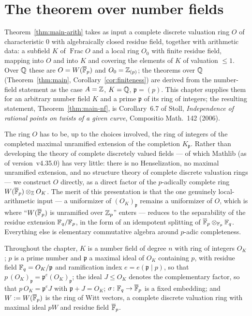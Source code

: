 \chapter{The theorem over number fields}
\label{ch:numberfield}

Theorem~\ref{thm:main-arith} takes as input a complete discrete valuation ring $O$ of
characteristic $0$ with algebraically closed residue field, together with arithmetic
data: a subfield $K$ of $\operatorname{Frac} O$ and a local ring $O_0$ with finite
residue field, mapping into $O$ and into $K$ and covering the elements of $K$ of
valuation $\le 1$. Over $\mathbb{Q}$ these are $O = W(\overline{\mathbb{F}}_p)$ and $O_0 = \mathbb{Z}_{(p)}$; the
theorems over $\mathbb{Q}$ (Theorem~\ref{thm:main}, Corollary~\ref{cor:finiteness}) are derived
from the number-field statement as the case $A = \mathbb{Z}$, $K = \mathbb{Q}$, $\mathfrak p = (p)$. This chapter supplies
them for an arbitrary number field $K$ and a prime $\mathfrak p$ of its ring of integers; the resulting statement,
Theorem~\ref{thm:main-nf}, is Corollary~6.7 of Stoll, \emph{Independence of rational
points on twists of a given curve}, Compositio Math.\ 142 (2006).

The ring $O$ has to be, up to the choices involved, the ring of integers of the completed
maximal unramified extension of the completion $K_{\mathfrak p}$. Rather than developing
the theory of complete discretely valued fields --- of which Mathlib (as of
version~v4.35.0) has very little: there is no Henselization, no maximal unramified extension, and no structure
theory of complete discrete valuation rings --- we construct $O$ directly, as a direct
factor of the $p$-adically complete ring $W(\overline{\mathbb{F}}_p) \otimes_{\mathbb{Z}} O_K$. The merit of this
presentation is that the one genuinely local-arithmetic input --- a uniformizer of
$(O_K)_{\mathfrak p}$ remains a uniformizer of $O$, which is where ``$W(\overline{\mathbb{F}}_p)$ is
unramified over $\mathbb{Z}_p$'' enters --- reduces to the separability of the residue extension
$\mathbb{F}_q/\mathbb{F}_p$, in the form of an idempotent splitting of $\overline{\mathbb{F}}_p \otimes_{\mathbb{F}_p} \mathbb{F}_q$.
Everything else is elementary commutative algebra around $p$-adic completeness.

Throughout the chapter, $K$ is a number field of degree $n$ with ring of integers $O_K$;
$p$ is a prime number and $\mathfrak p$ a maximal ideal of $O_K$ containing $p$, with
residue field $\mathbb{F}_q = O_K/\mathfrak p$ and ramification index $e = e(\mathfrak p \mid p)$,
so that $p\,(O_K)_{\mathfrak p} = \mathfrak p^e (O_K)_{\mathfrak p}$; the ideal
$J \le O_K$ denotes the complementary factor, so that $p\,O_K = \mathfrak p^e J$ with
$\mathfrak p + J = O_K$; $\sigma \colon \mathbb{F}_q \to \overline{\mathbb{F}}_p$ is a fixed embedding; and
$W := W(\overline{\mathbb{F}}_p)$ is the ring of Witt vectors, a complete discrete valuation ring with
maximal ideal $pW$ and residue field $\overline{\mathbb{F}}_p$.


